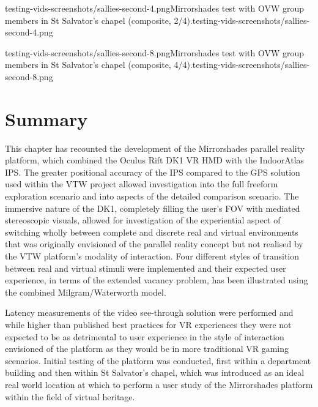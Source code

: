        {testing-vids-screenshots/sallies-second-4.png}{Mirrorshades test with OVW group members in St Salvator's chapel (composite, 2/4).}{testing-vids-screenshots/sallies-second-4.png}


       {testing-vids-screenshots/sallies-second-8.png}{Mirrorshades test with OVW group members in St Salvator's chapel (composite, 4/4).}{testing-vids-screenshots/sallies-second-8.png}


\section{Summary}
This chapter has recounted the development of the Mirrorshades parallel reality platform, which combined the Oculus Rift DK1 VR HMD with the IndoorAtlas IPS. The greater positional accuracy of the IPS compared to the GPS solution used within the VTW project allowed investigation into the full freeform exploration scenario and into aspects of the detailed comparison scenario. The immersive nature of the DK1, completely filling the user's FOV with mediated stereoscopic visuals, allowed for investigation of the experiential aspect of switching wholly between complete and discrete real and virtual environments that was originally envisioned of the parallel reality concept but not realised by the VTW platform's modality of interaction. Four different styles of transition between real and virtual stimuli were implemented and their expected user experience, in terms of the extended vacancy problem, has been illustrated using the combined Milgram/Waterworth model.

Latency measurements of the video see-through solution were performed and while higher than published best practices for VR experiences they were not expected to be as detrimental to user experience in the style of interaction envisioned of the platform as they would be in more traditional VR gaming scenarios. Initial testing of the platform was conducted, first within a department building and then within St Salvator's chapel, which was introduced as an ideal real world location at which to perform a user study of the Mirrorshades platform within the field of virtual heritage.


